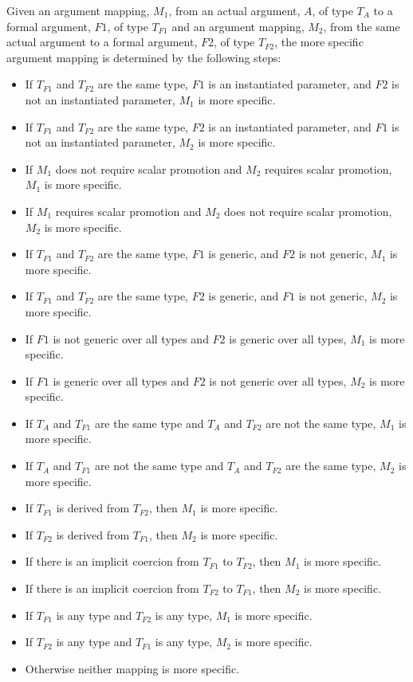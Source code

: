 Given an argument mapping, $M_1$, from an actual argument, $A$, of
type $T_A$ to a formal argument, $F1$, of type $T_{F1}$ and an
argument mapping, $M_2$, from the same actual argument to a formal
argument, $F2$, of type $T_{F2}$, the more specific argument mapping
is determined by the following steps:
\begin{itemize}
\item
 If $T_{F1}$ and $T_{F2}$ are the same type, $F1$ is an instantiated
 parameter, and $F2$ is not an instantiated parameter, $M_1$ is more
 specific.
\item
 If $T_{F1}$ and $T_{F2}$ are the same type, $F2$ is an instantiated
 parameter, and $F1$ is not an instantiated parameter, $M_2$ is more
 specific.
\item
 If $M_1$ does not require scalar promotion and $M_2$ requires scalar
 promotion, $M_1$ is more specific.
\item
 If $M_1$ requires scalar promotion and $M_2$ does not require scalar
 promotion, $M_2$ is more specific.
\item
 If $T_{F1}$ and $T_{F2}$ are the same type, $F1$ is generic, and $F2$
 is not generic, $M_1$ is more specific.
\item
 If $T_{F1}$ and $T_{F2}$ are the same type, $F2$ is generic, and $F1$
 is not generic, $M_2$ is more specific.
\item
 If $F1$ is not generic over all types and $F2$ is generic over all
 types, $M_1$ is more specific.
\item
 If $F1$ is generic over all types and $F2$ is not generic over all
 types, $M_2$ is more specific.
\item
 If $T_A$ and $T_{F1}$ are the same type and $T_A$ and $T_{F2}$ are
 not the same type, $M_1$ is more specific.
\item
 If $T_A$ and $T_{F1}$ are not the same type and $T_A$ and $T_{F2}$
 are the same type, $M_2$ is more specific.
\item
 If $T_{F1}$ is derived from $T_{F2}$, then $M_1$ is more specific.
\item
 If $T_{F2}$ is derived from $T_{F1}$, then $M_2$ is more specific.
\item
 If there is an implicit coercion from $T_{F1}$ to $T_{F2}$, then
 $M_1$ is more specific.
\item
 If there is an implicit coercion from $T_{F2}$ to $T_{F1}$, then
 $M_2$ is more specific.
\item
 If $T_{F1}$ is any  type and $T_{F2}$ is any 
 type, $M_1$ is more specific.
\item
 If $T_{F2}$ is any  type and $T_{F1}$ is any 
 type, $M_2$ is more specific.
\item
 Otherwise neither mapping is more specific.
\end{itemize}
